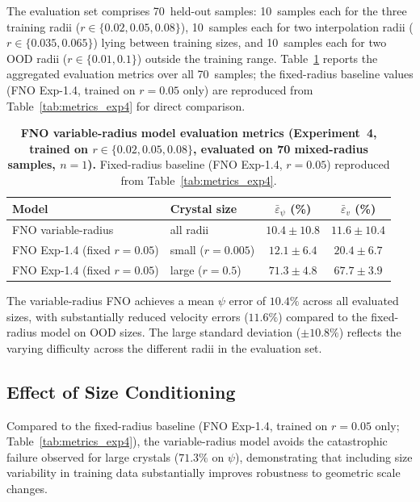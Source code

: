 The evaluation set comprises 70~held-out samples: 10~samples each for the three training radii ($r \in \{0.02, 0.05, 0.08\}$), 10~samples each for two interpolation radii ($r \in \{0.035, 0.065\}$) lying between training sizes, and 10~samples each for two OOD radii ($r \in \{0.01, 0.1\}$) outside the training range. Table~\ref{tab:fno_metrics_exp4_var} reports the aggregated evaluation metrics over all 70~samples; the fixed-radius baseline values (FNO Exp-1.4, trained on $r = 0.05$ only) are reproduced from Table~\ref{tab:metrics_exp4} for direct comparison.

\begin{table}[htbp]
\centering
\caption{\textbf{FNO variable-radius model evaluation metrics (Experiment~4, trained on
         $r \in \{0.02, 0.05, 0.08\}$, evaluated on 70 mixed-radius samples, $n=1$).}
         Fixed-radius baseline (FNO Exp-1.4, $r=0.05$) reproduced from Table~\ref{tab:metrics_exp4}.}
\label{tab:fno_metrics_exp4_var}
\begin{tabular}{llcc}
\toprule
\textbf{Model} & \textbf{Crystal size} & $\bar{\varepsilon}_\psi$ (\%) & $\bar{\varepsilon}_v$ (\%) \\
\midrule
FNO variable-radius & all radii & $10.4 \pm 10.8$ & $11.6 \pm 10.4$ \\
\midrule
FNO Exp-1.4 (fixed $r=0.05$) & small ($r=0.005$) & $12.1 \pm 6.4$ & $20.4 \pm 6.7$ \\
FNO Exp-1.4 (fixed $r=0.05$) & large ($r=0.5$)   & $71.3 \pm 4.8$ & $67.7 \pm 3.9$ \\
\bottomrule
\end{tabular}
\end{table}

The variable-radius FNO achieves a mean $\psi$ error of $10.4\%$ across all evaluated sizes, with substantially reduced velocity errors ($11.6\%$) compared to the fixed-radius model on OOD sizes. The large standard deviation ($\pm 10.8\%$) reflects the varying difficulty across the different radii in the evaluation set.

\subsection{Effect of Size Conditioning}
\label{ssec:results:exp4:conditioning}

Compared to the fixed-radius baseline (FNO Exp-1.4, trained on $r = 0.05$ only; Table~\ref{tab:metrics_exp4}), the variable-radius model avoids the catastrophic failure observed for large crystals ($71.3\%$ on $\psi$), demonstrating that including size variability in training data substantially improves robustness to geometric scale changes.

